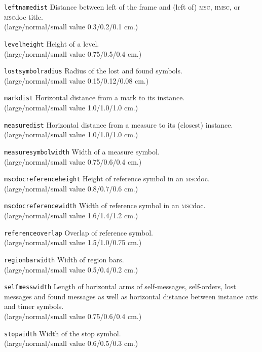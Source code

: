 \documentclass[a4paper]{article}
\newcommand{\cmd}[1]{\texttt{\bslash #1}}
\newcommand{\acro}[1]{{\scshape\lowercase{#1}}}
\newcommand\MSC{\acro{MSC}}
\newcommand\HMSC{\acro{HMSC}}
\newcommand{\MSCdoc}{\MSC{}doc}
\newcommand{\lnsvalue}[3]{large/normal/small value #1/#2/#3}
\newenvironment{defs}{%
  \begin{list}{}%
              {\setlength{\labelwidth}{0pt}%
               \setlength{\labelsep}{1em}%
               \setlength{\leftmargin}{1em}%
               \setlength{\parsep}{1ex}%
               \setlength{\listparindent}{0pt}%
               \setlength{\rightmargin}{0pt}%
               \renewcommand{\makelabel}[1]{##1}%
               \raggedright%
              }%
  }{%
  \end{list}}
\begin{document}
\begin{defs}
\item[\cmd{leftnamedist}] Distance between left of the frame and
(left of) \MSC, \HMSC, or \MSCdoc{} title.\\
(\lnsvalue{0.3}{0.2}{0.1} cm.)

\item[\cmd{levelheight}]
Height of a level.\\
(\lnsvalue{0.75}{0.5}{0.4} cm.)

\item[\cmd{lostsymbolradius}]
Radius of the lost and found symbols.\\
(\lnsvalue{0.15}{0.12}{0.08} cm.)

\item[\cmd{markdist}]
Horizontal distance from a mark to its instance.\\
(\lnsvalue{1.0}{1.0}{1.0} cm.)

\item[\cmd{measuredist}]
Horizontal distance from a measure to its (closest) instance.\\
(\lnsvalue{1.0}{1.0}{1.0} cm.)

\item[\cmd{measuresymbolwidth}]
Width of a measure symbol.\\
(\lnsvalue{0.75}{0.6}{0.4} cm.)

\item[\cmd{mscdocreferenceheight}]
Height of reference symbol in an \MSCdoc.\\
(\lnsvalue{0.8}{0.7}{0.6} cm.)

\item[\cmd{mscdocreferencewidth}]
Width of reference symbol in an \MSCdoc.\\
(\lnsvalue{1.6}{1.4}{1.2} cm.)

\item[\cmd{referenceoverlap}]
Overlap of reference symbol.\\
(\lnsvalue{1.5}{1.0}{0.75} cm.)

\item[\cmd{regionbarwidth}]
Width of region bars.\\
(\lnsvalue{0.5}{0.4}{0.2} cm.)

\item[\cmd{selfmesswidth}] Length of horizontal arms of self-messages,
self-orders, lost messages and found messages as well as horizontal
distance between instance axis and timer symbols.\\
(\lnsvalue{0.75}{0.6}{0.4} cm.)

\item[\cmd{stopwidth}]
Width of the stop symbol.\\
(\lnsvalue{0.6}{0.5}{0.3} cm.)


\end{defs}
\end{document}
